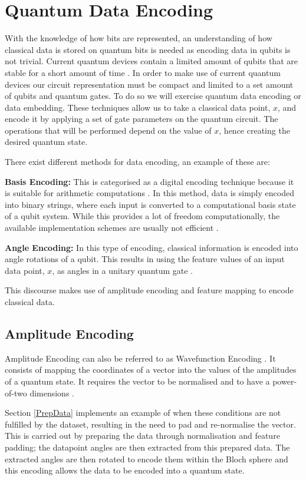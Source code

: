 \section{Quantum Data Encoding}
With the knowledge of how bits are represented, an understanding of how classical data is stored on quantum bits is needed as encoding data in qubits is not trivial. Current quantum devices contain a limited amount of qubits that are stable for a short amount of time \citep{DataEn}. In order to make use of current quantum devices our circuit representation must be compact and limited to a set amount of qubits and quantum gates. To do so we will exercise quantum data encoding or data embedding. These techniques allow us to take a classical data point, $x$, and encode it by applying a set of gate parameters on the quantum circuit. The operations that will be performed depend on the value of $x$, hence creating the desired quantum state.

There exist different methods for data encoding, an example of these are:

\textbf{Basis Encoding:} This is categorised as a digital encoding technique because it is suitable for arithmetic computations \citep{Leymann}. In this method, data is simply encoded into binary strings, where each input is converted to a computational basis state of a qubit system. 
While this provides a lot of freedom computationally, the available implementation schemes are usually not efficient \citep{rodneyD}.



\textbf{Angle Encoding:} In this type of encoding, classical information is encoded into angle rotations of a qubit. This results in using the feature values of an input data point, $x$, as angles in a unitary quantum gate \citep{rodneyD}.

This discourse makes use of amplitude encoding and feature mapping to encode classical data. 

\subsection{Amplitude Encoding}\label{AmpEnBack}

Amplitude Encoding can also be referred to as Wavefunction Encoding \citep{LaRoseC}. It consists of mapping the coordinates of a vector into the values of the amplitudes of a quantum state. It requires the vector to be normalised and to have a power-of-two dimensions \citep{slimaneT}. 

Section \ref{PrepData} implements an example of when these conditions are not fulfilled by the dataset, resulting in the need to pad and re-normalise the vector. This is carried out by preparing the data through normalisation and feature padding; the datapoint angles are then extracted from this prepared data. The extracted angles are then rotated to encode them within the Bloch sphere and this encoding allows the data to be encoded into a quantum state. 

